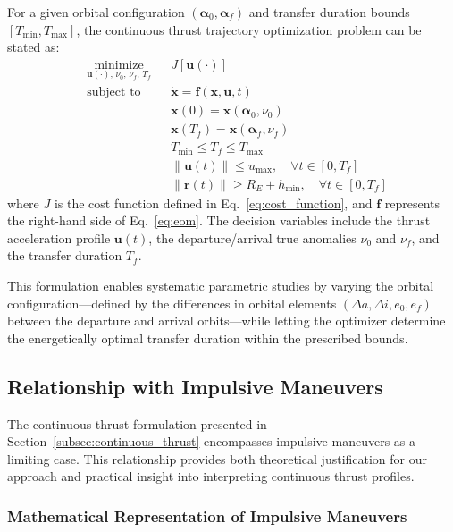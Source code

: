 \documentclass[a4paper,fleqn]{cas-dc}
\let\origsubsection\subsection
\renewcommand{\subsection}{\FloatBarrier\origsubsection}
\begin{document}
For a given orbital configuration $(\boldsymbol{\alpha}_0, \boldsymbol{\alpha}_f)$ and transfer duration bounds $[T_{\min}, T_{\max}]$, the continuous thrust trajectory optimization problem can be stated as:
\begin{equation}\label{eq:ocp}
\begin{aligned}
& \underset{\mathbf{u}(\cdot),\, \nu_0,\, \nu_f,\, T_f}{\text{minimize}} & & J[\mathbf{u}(\cdot)] \\
& \text{subject to} & & \dot{\mathbf{x}} = \mathbf{f}(\mathbf{x}, \mathbf{u}, t) \\
& & & \mathbf{x}(0) = \mathbf{x}(\boldsymbol{\alpha}_0, \nu_0) \\
& & & \mathbf{x}(T_f) = \mathbf{x}(\boldsymbol{\alpha}_f, \nu_f) \\
& & & T_{\min} \leq T_f \leq T_{\max} \\
& & & \|\mathbf{u}(t)\| \leq u_{\max}, \quad \forall t \in [0, T_f] \\
& & & \|\mathbf{r}(t)\| \geq R_E + h_{\min}, \quad \forall t \in [0, T_f]
\end{aligned}
\end{equation}
where $J$ is the cost function defined in Eq.~\eqref{eq:cost_function}, and $\mathbf{f}$ represents the right-hand side of Eq.~\eqref{eq:eom}. The decision variables include the thrust acceleration profile $\mathbf{u}(t)$, the departure/arrival true anomalies $\nu_0$ and $\nu_f$, and the transfer duration $T_f$.

This formulation enables systematic parametric studies by varying the orbital configuration---defined by the differences in orbital elements $(\Delta a, \Delta i, e_0, e_f)$ between the departure and arrival orbits---while letting the optimizer determine the energetically optimal transfer duration within the prescribed bounds.

\subsection{Relationship with Impulsive Maneuvers}\label{subsec:impulsive_relation}

The continuous thrust formulation presented in Section~\ref{subsec:continuous_thrust} encompasses impulsive maneuvers as a limiting case. This relationship provides both theoretical justification for our approach and practical insight into interpreting continuous thrust profiles.

\subsubsection{Mathematical Representation of Impulsive Maneuvers}
\end{document}
